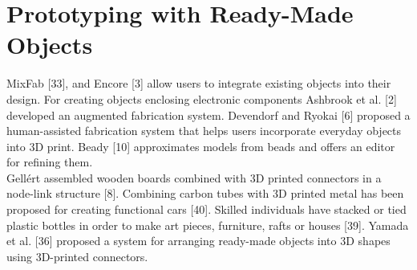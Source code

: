 \section{Prototyping with Ready-Made Objects}
MixFab [33], and Encore [3] allow users to integrate existing objects into their design. For creating objects enclosing electronic components Ashbrook et al. [2] developed an augmented fabrication system. Devendorf and Ryokai [6] proposed a human-assisted fabrication system that helps users incorporate everyday objects into 3D print. Beady [10] approximates models from beads and offers an editor for refining them.\\
Gellért assembled wooden boards combined with 3D printed connectors in a node-link structure [8]. Combining carbon tubes with 3D printed metal has been proposed for creating functional cars [40].
Skilled individuals have stacked or tied plastic bottles in order to make art pieces, furniture, rafts or houses [39]. Yamada et al. [36] proposed a system for arranging ready-made objects into 3D shapes using 3D-printed connectors.

